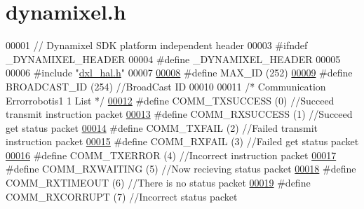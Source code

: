 \hypertarget{dynamixel_8h_source}{}\section{dynamixel.\+h}
\label{dynamixel_8h_source}

\begin{DoxyCode}
00001 \textcolor{comment}{// Dynamixel SDK platform independent header}
00003 \textcolor{preprocessor}{#ifndef \_DYNAMIXEL\_HEADER}
00004 \textcolor{preprocessor}{#define \_DYNAMIXEL\_HEADER}
00005 
00006 \textcolor{preprocessor}{#include "\hyperlink{dxl__hal_8h}{dxl\_hal.h}"}
00007 
\hypertarget{dynamixel_8h_source_l00008}{}\hyperlink{dynamixel_8h_a1cdef4472847c938fc165b7d2737c4e4}{00008} \textcolor{preprocessor}{#define MAX\_ID              (252)}
\hypertarget{dynamixel_8h_source_l00009}{}\hyperlink{dynamixel_8h_ab9fe47395310b34fa1ceb112c9ca10e2}{00009} \textcolor{preprocessor}{#define BROADCAST\_ID        (254)  //BroadCast ID}
00010 
00011 \textcolor{comment}{/* Communication Errorrobotis1  1 List */}
\hypertarget{dynamixel_8h_source_l00012}{}\hyperlink{dynamixel_8h_aac6d30f996256b24d311de81eb0f0c1e}{00012} \textcolor{preprocessor}{#define COMM\_TXSUCCESS      (0)  //Succeed transmit instruction packet}
\hypertarget{dynamixel_8h_source_l00013}{}\hyperlink{dynamixel_8h_a171328d9f298535c18d079f65e631434}{00013} \textcolor{preprocessor}{#define COMM\_RXSUCCESS      (1)  //Succeed get status packet}
\hypertarget{dynamixel_8h_source_l00014}{}\hyperlink{dynamixel_8h_af88390c8be18c4079e65fd07b8d553be}{00014} \textcolor{preprocessor}{#define COMM\_TXFAIL         (2)  //Failed transmit instruction packet}
\hypertarget{dynamixel_8h_source_l00015}{}\hyperlink{dynamixel_8h_a7a274a04e144aac01bedabaec005fd6f}{00015} \textcolor{preprocessor}{#define COMM\_RXFAIL         (3)  //Failed get status packet}
\hypertarget{dynamixel_8h_source_l00016}{}\hyperlink{dynamixel_8h_a1bd7c7b30db4f56dc80cef65ad38afff}{00016} \textcolor{preprocessor}{#define COMM\_TXERROR        (4)  //Incorrect instruction packet}
\hypertarget{dynamixel_8h_source_l00017}{}\hyperlink{dynamixel_8h_ae4b5e71a685506956bf151e3117f3487}{00017} \textcolor{preprocessor}{#define COMM\_RXWAITING      (5)  //Now recieving status packet}
\hypertarget{dynamixel_8h_source_l00018}{}\hyperlink{dynamixel_8h_af9976398353d104bb8a78b1f02f9fceb}{00018} \textcolor{preprocessor}{#define COMM\_RXTIMEOUT      (6)  //There is no status packet}
\hypertarget{dynamixel_8h_source_l00019}{}\hyperlink{dynamixel_8h_a93c30bd345d8077112f0a3524d26278b}{00019} \textcolor{preprocessor}{#define COMM\_RXCORRUPT      (7)  //Incorrect status packet}

\end{DoxyCode}
